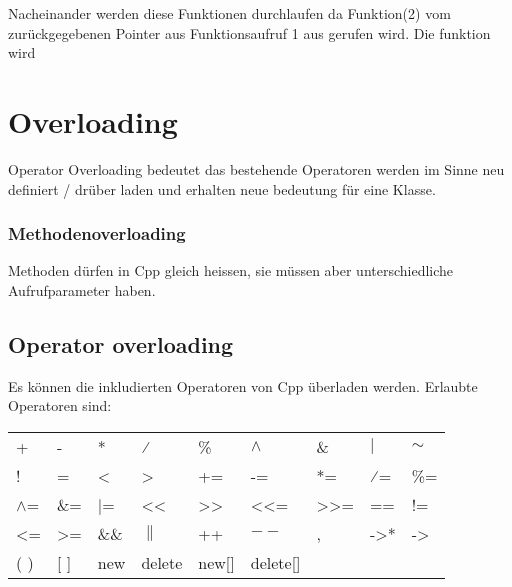 Nacheinander werden diese Funktionen durchlaufen da Funktion(2) vom zurückgegebenen Pointer aus Funktionsaufruf 1 aus gerufen wird.
Die funktion wird 


\section{Overloading}

Operator Overloading bedeutet das bestehende Operatoren  werden im Sinne neu definiert / drüber laden und erhalten neue bedeutung für eine Klasse. 


\subsubsection{Methodenoverloading}

Methoden dürfen in Cpp gleich heissen, sie müssen aber unterschiedliche Aufrufparameter haben.



\subsection{Operator overloading}

Es können die inkludierten Operatoren von Cpp überladen werden. 
Erlaubte Operatoren sind:\\
\begin{tabular}{lllllllll}
    +            & -               & *           & ⁄                      & \%                           & $\wedge$                & \&                            & $|$              & $\sim$          \\
    !            & =               & \textless{} & \textgreater{}         & +=                           & -=                      & *=                            & ⁄=               & \%=             \\
    $\wedge$=    & \&=             & $|$=        & \textless{}\textless{} & \textgreater{}\textgreater{} & \textless{}\textless{}= & \textgreater{}\textgreater{}= & ==               & !=              \\
    \textless{}= & \textgreater{}= & \&\&        & $\|$                   & ++                           & $--$                    & ,                             & -\textgreater{}* & -\textgreater{} \\
    ( )          & {[} {]}         & new         & delete                 & new{[}{]}                    & delete{[}{]}            &                               &                  &                
\end{tabular}


